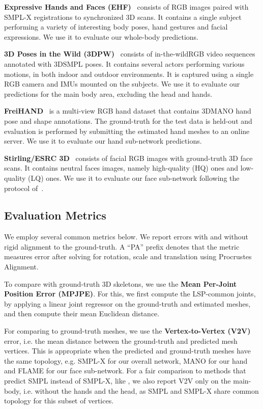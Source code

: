 \documentclass[runningheads]{llncs}
\newcommand{\smplx}{\mbox{SMPL-X}\xspace}
\newcommand{\groundtruth}{\mbox{ground-truth}\xspace}
\newcommand{\freihand}{\mbox{FreiHAND}\xspace}
\newcommand{\smpl}{\mbox{SMPL}\xspace}
\newcommand{\mano}{\mbox{MANO}\xspace}
\newcommand{\flame}{\mbox{FLAME}\xspace}
\newcommand{\inthewild}{\mbox{in-the-wild}\xspace}
\newcommand{\threeD}{3D\xspace}
\newcommand{\ehf}{\mbox{EHF}\xspace}
\newcommand{\ie}{i.e.\xspace}
\newcommand{\eg}{e.g.\xspace}
\newcommand{\rgb}{\mbox{RGB}\xspace}
\begin{document}
\textbf{Expressive Hands and Faces (\ehf)}~\cite{Pavlakos_2019_CVPR}
consists of  \rgb images paired with \smplx registrations to synchronized \threeD scans.
It contains a single subject performing a variety of interesting body poses, hand gestures and facial expressions.
We use it to evaluate our whole-body predictions.

\textbf{\threeD Poses in the Wild (3DPW)}~\cite{vonmarcard_eccv_2018_3dpw}
consists of \inthewild \rgb video sequences annotated with \threeD \smpl poses.
It contains several actors performing various motions, in both indoor and outdoor environments.
It is captured using a single \rgb camera and IMUs mounted on the subjects.
We use it to evaluate our predictions for the main body area, excluding the head and hands.

\textbf{\freihand}~\cite{Freihand2019}
is a multi-view \rgb hand dataset that contains \threeD \mano hand pose and shape annotations.
The \groundtruth for the test data is held-out and evaluation is performed by submitting the estimated hand meshes to an online server.
We use it to evaluate our hand sub-network predictions. 

\textbf{Stirling/ESRC 3D}~\cite{feng2018evaluation}
consists of facial \rgb images with \groundtruth \threeD face scans.
It contains  neutral faces images, namely  high-quality (HQ) ones and  low-quality (LQ) ones.
We use it to evaluate our face sub-network following the protocol of~\cite{feng2018evaluation}.

\subsection{Evaluation Metrics}
\label{subsec:metrics}
We employ several common metrics below.
We report errors with and without rigid alignment to the \groundtruth.
A ``PA'' prefix denotes that the metric measures error after solving
for  rotation, scale and translation using Procrustes Alignment.

To compare with \groundtruth \threeD skeletons, we use the \textbf{Mean Per-Joint Position Error (MPJPE)}.
For this, we first compute the  LSP-common joints, by applying a linear joint regressor on the \groundtruth
and estimated meshes, and then compute their mean Euclidean distance.

For comparing to \groundtruth meshes, we use the \textbf{Vertex-to-Vertex (V2V)}
error, \ie the mean distance between the \groundtruth and predicted mesh vertices.
This is appropriate when the predicted and \groundtruth meshes have the same topology, \eg
\smplx 	for our overall network,
\mano 	for our hand and
\flame 	for our face sub-network.
For a fair comparison to methods that predict \smpl instead of \smplx,
like \cite{kanazawa_cvpr_2018,Kolotouros_2019_ICCV}, we also report V2V only on the main-body,
\ie without the hands and the head,
as \smpl and \smplx share common topology for this subset of vertices.
\end{document}

